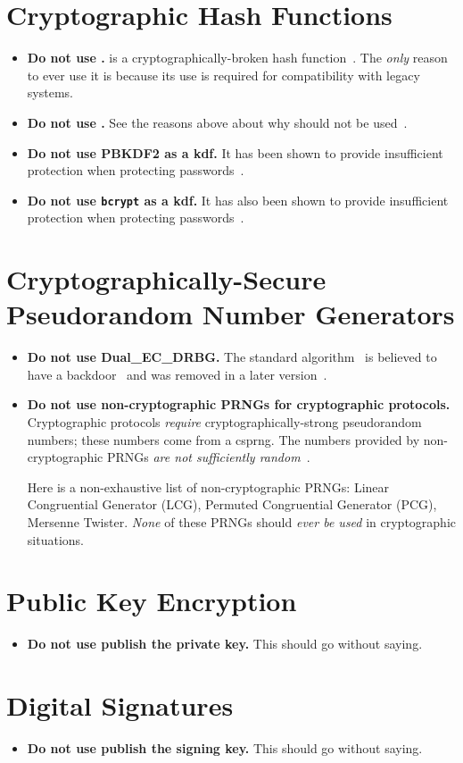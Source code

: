 \section{Cryptographic Hash Functions}

\begin{itemize}
\item \textbf{Do not use \MDFive{}.}
    \MDFive{} is a cryptographically-broken \gls{hash function}~\cite{rfc6151}.
    The \emph{only} reason to ever use it is because its use is required
        for compatibility with legacy systems.
\item \textbf{Do not use \ShaOne{}.}
    See the reasons above about why \MDFive{}
    should not be used~\cite{rfc6194,cryptoeprint:2020/014}.
\item \textbf{Do not use PBKDF2 as a \gls{kdf}.}
    It has been shown to provide insufficient protection
    when protecting passwords~\cite{blocki2018economics}.
\item \textbf{Do not use \texttt{bcrypt} as a \gls{kdf}.}
    It has also been shown to provide insufficient protection
    when protecting passwords~\cite{blocki2018economics}.
\end{itemize}

\section{Cryptographically-Secure Pseudorandom Number Generators}

\begin{itemize}
\item \textbf{Do not use Dual\_EC\_DRBG.}
    The standard algorithm~\cite[Section~10.3.1]{NIST-SP-800-90A}
    is believed to have a backdoor~\cite{BernsteinDualEC}
    and was removed in a later version~\cite{NIST-SP-800-90ARev1}.
\item \textbf{Do not use non-cryptographic PRNGs for cryptographic protocols.}
    Cryptographic protocols \emph{require} cryptographically-strong
    pseudorandom numbers;
    these numbers come from a \gls{csprng}.
    The numbers provided by non-cryptographic PRNGs
    \emph{are not sufficiently random}~\cite{marsaglia1968random,bouillaguet2020practical}.

    Here is a non-exhaustive list of non-cryptographic PRNGs:
    Linear Congruential Generator (LCG), Permuted Congruential Generator (PCG),
    Mersenne Twister.
    \emph{None} of these PRNGs should \emph{ever be used}
    in cryptographic situations.
\end{itemize}

\section{Public Key Encryption}

\begin{itemize}
\item \textbf{Do not use publish the private key.}
    This should go without saying.
\end{itemize}

\section{Digital Signatures}

\begin{itemize}
\item \textbf{Do not use publish the signing key.}
    This should go without saying.
\end{itemize}

